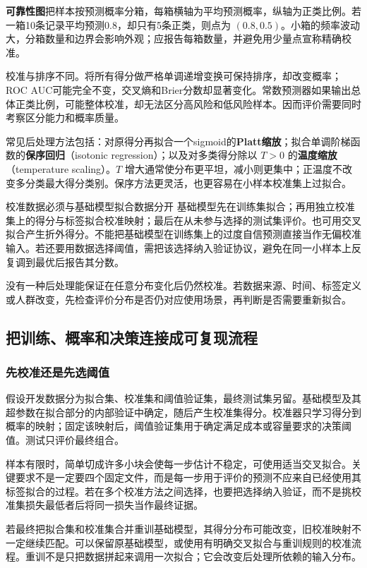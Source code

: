 \documentclass[UTF8,fontset=none,zihao=-4,a4paper]{ctexart}
\newcommand{\term}[1]{\textbf{#1}}
\numberwithin{equation}{section}
\numberwithin{figure}{section}
\begin{document}
\term{可靠性图}把样本按预测概率分箱，每箱横轴为平均预测概率，纵轴为正类比例。若一箱10条记录平均预测0.8，却只有5条正类，则点为 $(0.8,0.5)$。小箱的频率波动大，分箱数量和边界会影响外观；应报告每箱数量，并避免用少量点宣称精确校准。

校准与排序不同。将所有得分做严格单调递增变换可保持排序，却改变概率；ROC AUC可能完全不变，交叉熵和Brier分数却显著变化。常数预测器如果输出总体正类比例，可能整体校准，却无法区分高风险和低风险样本。因而评价需要同时考察区分能力和概率质量。

常见后处理方法包括：对原得分再拟合一个sigmoid的\term{Platt缩放}；拟合单调阶梯函数的\term{保序回归}（isotonic regression）；以及对多类得分除以 $T>0$ 的\term{温度缩放}（temperature scaling）。$T$ 增大通常使分布更平坦，减小则更集中；正温度不改变多分类最大得分类别。保序方法更灵活，也更容易在小样本校准集上过拟合。

\begin{infobox}{校准数据必须与基础模型拟合数据分开}
基础模型先在训练集拟合；再用独立校准集上的得分与标签拟合校准映射；最后在从未参与选择的测试集评价。也可用交叉拟合产生折外得分。不能把基础模型在训练集上的过度自信预测直接当作无偏校准输入。若还要用数据选择阈值，需把该选择纳入验证协议，避免在同一小样本上反复调到最优后报告其分数。
\end{infobox}
没有一种后处理能保证在任意分布变化后仍然校准。若数据来源、时间、标签定义或人群改变，先检查评价分布是否仍对应使用场景，再判断是否需要重新拟合。

\subsection{把训练、概率和决策连接成可复现流程}
\subsubsection{先校准还是先选阈值}
假设开发数据分为拟合集、校准集和阈值验证集，最终测试集另留。基础模型及其超参数在拟合部分的内部验证中确定，随后产生校准集得分。校准器只学习得分到概率的映射；固定该映射后，阈值验证集用于确定满足成本或容量要求的决策阈值。测试只评价最终组合。

样本有限时，简单切成许多小块会使每一步估计不稳定，可使用适当交叉拟合。关键要求不是一定要四个固定文件，而是每一步用于评价的预测不应来自已经使用其标签拟合的过程。若在多个校准方法之间选择，也要把选择纳入验证，而不是挑校准集损失最低者后将同一损失当作最终证据。

若最终把拟合集和校准集合并重训基础模型，其得分分布可能改变，旧校准映射不一定继续匹配。可以保留原基础模型，或使用有明确交叉拟合与重训规则的校准流程。重训不是只把数据拼起来调用一次拟合；它会改变后处理所依赖的输入分布。
\end{document}

